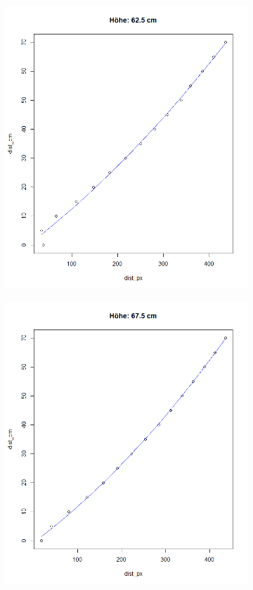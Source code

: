 \documentclass[a4paper]{report}
\begin{document}
\begin{figure}[h]
\begin{subfigure}[b]{0.3\textwidth}
	\end{subfigure}
	\quad
	\begin{subfigure}[b]{0.3\textwidth}
		\includegraphics[width=\textwidth]{hoehe62_5}
	\end{subfigure}
	\hfill
	\begin{subfigure}[b]{0.3\textwidth}
		\includegraphics[width=\textwidth]{hoehe67_5}

\end{subfigure}
\end{figure}
\end{document}
